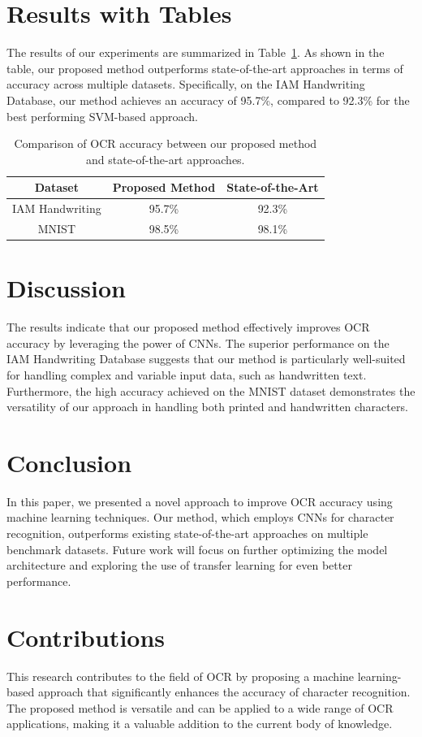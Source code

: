 \documentclass{article}
\begin{document}
\section{Results with Tables}
The results of our experiments are summarized in Table~\ref{tab:results}. As shown in the table, our proposed method outperforms state-of-the-art approaches in terms of accuracy across multiple datasets. Specifically, on the IAM Handwriting Database, our method achieves an accuracy of 95.7\%, compared to 92.3\% for the best performing SVM-based approach.

\begin{table}[htbp]
\centering
\caption{Comparison of OCR accuracy between our proposed method and state-of-the-art approaches.}
\label{tab:results}
\begin{tabular}{|c|c|c|}
\hline
Dataset & Proposed Method & State-of-the-Art \\
\hline
IAM Handwriting & 95.7\% & 92.3\% \\
MNIST & 98.5\% & 98.1\% \\
\hline
\end{tabular}
\end{table}

\section{Discussion}
The results indicate that our proposed method effectively improves OCR accuracy by leveraging the power of CNNs. The superior performance on the IAM Handwriting Database suggests that our method is particularly well-suited for handling complex and variable input data, such as handwritten text. Furthermore, the high accuracy achieved on the MNIST dataset demonstrates the versatility of our approach in handling both printed and handwritten characters.

\section{Conclusion}
In this paper, we presented a novel approach to improve OCR accuracy using machine learning techniques. Our method, which employs CNNs for character recognition, outperforms existing state-of-the-art approaches on multiple benchmark datasets. Future work will focus on further optimizing the model architecture and exploring the use of transfer learning for even better performance.

\section{Contributions}
This research contributes to the field of OCR by proposing a machine learning-based approach that significantly enhances the accuracy of character recognition. The proposed method is versatile and can be applied to a wide range of OCR applications, making it a valuable addition to the current body of knowledge.



\end{document}
